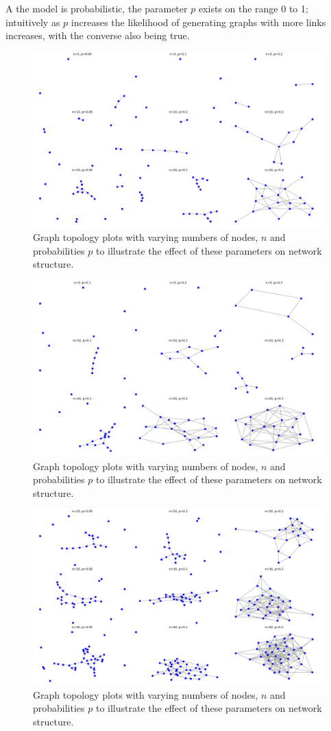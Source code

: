 A the model is probabilistic, the parameter $p$ exists on the range 0 to 1; intuitively as $p$ increases the likelihood of generating graphs with more links increases, with the converse also being true.

\begin{figure}
    \centering
    \includegraphics[width=0.75\linewidth]{images/ER/low_prob/low_prob_5,10,20.png}
    \caption{Graph topology plots with varying numbers of nodes, $n$ and probabilities $p$ to illustrate the effect of these parameters on network structure.}
    \label{fig:low_prob_5,10,20}
\end{figure}

\begin{figure}
    \centering
    \includegraphics[width=0.75\linewidth]{images/ER/5,10,20.png}
    \caption{Graph topology plots with varying numbers of nodes, $n$ and probabilities $p$ to illustrate the effect of these parameters on network structure.}
    \label{fig:5,10,20}
\end{figure}

\begin{figure}
    \centering
    \includegraphics[width=0.75\linewidth]{images/ER/low_prob/low_prob_20,30,40.png}
    \caption{Graph topology plots with varying numbers of nodes, $n$ and probabilities $p$ to illustrate the effect of these parameters on network structure.}
    \label{fig:low_prob_20,30,40}
\end{figure}

